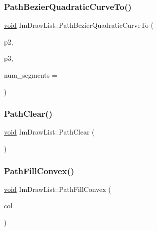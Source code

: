 \mbox{\label{structImDrawList_af48c5212d06ca5967f70da33ffadbc86}} 
\subsubsection{\texorpdfstring{Path\+Bezier\+Quadratic\+Curve\+To()}{PathBezierQuadraticCurveTo()}}
{\footnotesize\ttfamily \hyperlink{imgui__impl__opengl3__loader_8h_ac668e7cffd9e2e9cfee428b9b2f34fa7}{void} Im\+Draw\+List\+::\+Path\+Bezier\+Quadratic\+Curve\+To (\begin{DoxyParamCaption}\item[{const \hyperlink{structImVec2}{Im\+Vec2} \&}]{p2,  }\item[{const \hyperlink{structImVec2}{Im\+Vec2} \&}]{p3,  }\item[{int}]{num\+\_\+segments = {} }\end{DoxyParamCaption})}

\mbox{\label{structImDrawList_ae9ad5f4d638b1bfd9383618dc60e3f18}} 
\subsubsection{\texorpdfstring{Path\+Clear()}{PathClear()}}
{\footnotesize\ttfamily \hyperlink{imgui__impl__opengl3__loader_8h_ac668e7cffd9e2e9cfee428b9b2f34fa7}{void} Im\+Draw\+List\+::\+Path\+Clear (\begin{DoxyParamCaption}{ }\end{DoxyParamCaption})\hspace{0.3cm}{\ttfamily [inline]}}

\mbox{\label{structImDrawList_aea9301cb99ebf4b27f5d3959017567c9}} 
\subsubsection{\texorpdfstring{Path\+Fill\+Convex()}{PathFillConvex()}}
{\footnotesize\ttfamily \hyperlink{imgui__impl__opengl3__loader_8h_ac668e7cffd9e2e9cfee428b9b2f34fa7}{void} Im\+Draw\+List\+::\+Path\+Fill\+Convex (\begin{DoxyParamCaption}\item[{Im\+U32}]{col }\end{DoxyParamCaption})\hspace{0.3cm}{\ttfamily [inline]}}

